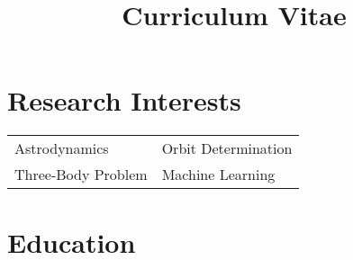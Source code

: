 \documentclass[10pt,a4paper,times]{moderncv}
\title{Curriculum Vitae}
\begin{document}
\makecvtitle
\vspace{-35 pt}



\section{Research Interests}
\begin{tabular}{ll}
Astrodynamics  \hspace{12em} & Orbit Determination  \\
Three-Body Problem \hspace{12em} & Machine Learning  \\
\end{tabular}



\section{Education}
\end{document}
